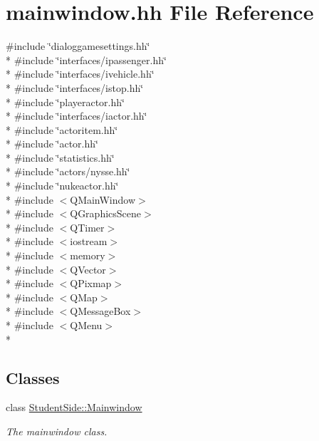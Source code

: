 \hypertarget{mainwindow_8hh}{\section{mainwindow.\-hh File Reference}
\label{mainwindow_8hh}
}
{\ttfamily \#include \char`\"{}dialoggamesettings.\-hh\char`\"{}}\\*
{\ttfamily \#include \char`\"{}interfaces/ipassenger.\-hh\char`\"{}}\\*
{\ttfamily \#include \char`\"{}interfaces/ivehicle.\-hh\char`\"{}}\\*
{\ttfamily \#include \char`\"{}interfaces/istop.\-hh\char`\"{}}\\*
{\ttfamily \#include \char`\"{}playeractor.\-hh\char`\"{}}\\*
{\ttfamily \#include \char`\"{}interfaces/iactor.\-hh\char`\"{}}\\*
{\ttfamily \#include \char`\"{}actoritem.\-hh\char`\"{}}\\*
{\ttfamily \#include \char`\"{}actor.\-hh\char`\"{}}\\*
{\ttfamily \#include \char`\"{}statistics.\-hh\char`\"{}}\\*
{\ttfamily \#include \char`\"{}actors/nysse.\-hh\char`\"{}}\\*
{\ttfamily \#include \char`\"{}nukeactor.\-hh\char`\"{}}\\*
{\ttfamily \#include $<$Q\-Main\-Window$>$}\\*
{\ttfamily \#include $<$Q\-Graphics\-Scene$>$}\\*
{\ttfamily \#include $<$Q\-Timer$>$}\\*
{\ttfamily \#include $<$iostream$>$}\\*
{\ttfamily \#include $<$memory$>$}\\*
{\ttfamily \#include $<$Q\-Vector$>$}\\*
{\ttfamily \#include $<$Q\-Pixmap$>$}\\*
{\ttfamily \#include $<$Q\-Map$>$}\\*
{\ttfamily \#include $<$Q\-Message\-Box$>$}\\*
{\ttfamily \#include $<$Q\-Menu$>$}\\*
\subsection*{Classes}
\begin{DoxyCompactItemize}
\item 
class \hyperlink{class_student_side_1_1_mainwindow}{Student\-Side\-::\-Mainwindow}
\begin{DoxyCompactList}\small\item\em The mainwindow class. \end{DoxyCompactList}\end{DoxyCompactItemize}
